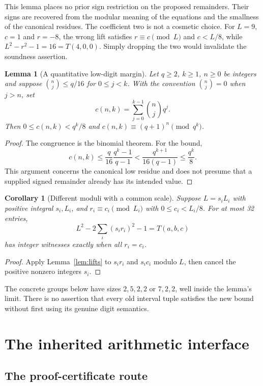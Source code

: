 \documentclass[10pt,letterpaper]{article}
\newtheorem{lemma}[theorem]{Lemma}
\newtheorem{corollary}[theorem]{Corollary}
\theoremstyle{definition}\newtheorem{definition}[theorem]{Definition}
\begin{document}
This lemma places no prior sign restriction on the proposed remainders.
Their signs are recovered from the modular meaning of the equations and
the smallness of the canonical residues. The coefficient two is not a
cosmetic choice. For $L=9$, $c=1$ and $r=-8$, the wrong lift satisfies
$r\equiv c\pmod L$ and $c<L/8$, while
$L^2-r^2-1=16=T(4,0,0)$. Simply dropping the two would invalidate the
soundness assertion.

\begin{lemma}[A quantitative low-digit margin]\label{lem:digits}
Let $q\ge2$, $k\ge1$, $n\ge0$ be integers and suppose
$\binom nj\le q/16$ for $0\le j<k$. With the convention
$\binom nj=0$ when $j>n$, set
\[
 c(n,k)=\sum_{j=0}^{k-1}\binom nj q^j.
\]
Then $0\le c(n,k)<q^k/8$ and
$c(n,k)\equiv(q+1)^n\pmod{q^k}$.
\end{lemma}
\begin{proof}
The congruence is the binomial theorem. For the bound,
\[
 c(n,k)\le\frac q{16}\frac{q^k-1}{q-1}
          <\frac{q^{k+1}}{16(q-1)}\le\frac{q^k}{8}.
\]
This argument concerns the canonical low residue and does not presume that
a supplied signed remainder already has its intended value.
\end{proof}

\begin{corollary}[Different moduli with a common scale]\label{cor:scaled}
Suppose $L=s_iL_i$ with positive integral $s_i,L_i$, and
$r_i\equiv c_i\pmod{L_i}$ with $0\le c_i<L_i/8$. For at most 32 entries,
\[
 L^2-2\sum_i (s_i r_i)^2-1=T(a,b,c)
\]
has integer witnesses exactly when all $r_i=c_i$.
\end{corollary}
\begin{proof}
Apply Lemma~\ref{lem:lifts} to $s_i r_i$ and $s_i c_i$ modulo $L$, then
cancel the positive nonzero integers $s_i$.
\end{proof}

The concrete groups below have sizes $2,5,2,2$ or $7,2,2$, well inside
the lemma's limit. There is no assertion that every old interval tuple
satisfies the new bound without first using its genuine digit semantics.

\section{The inherited arithmetic interface}

\subsection{The proof-certificate route}
\end{document}
